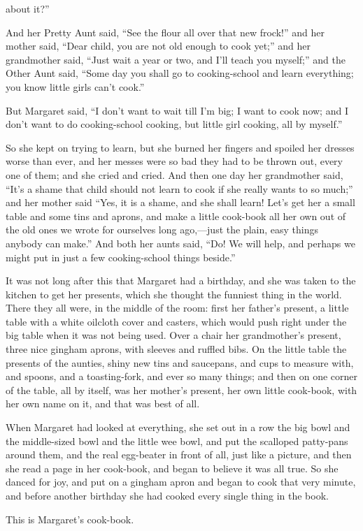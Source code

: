 \documentclass[11pt]{book}
\newcommand{\indpar}{\par\noindent\hspace*{\parindent}}
\begin{document}
about it?''
\indpar
  And her Pretty Aunt said, ``See the flour all over that new frock!''
and her mother said, ``Dear child, you are not old enough to cook yet;''
and her grandmother said, ``Just wait a year or two, and I'll teach you
myself;'' and the Other Aunt said, ``Some day you shall go to
cooking-school and learn everything; you know little girls can't cook.''
\indpar
  But Margaret said, ``I don't want to wait till I'm big; I want to
cook now; and I don't want to do cooking-school cooking, but little girl
cooking, all by myself.''
\indpar
  So she kept on trying to learn, $\!$but she burned her fingers and
spoiled her dresses worse than ever, and her messes were so bad they had
to be thrown out, every one of them; and she cried and cried.  And then
one day her grandmother said, ``It's a shame that child should not learn
to cook if she really wants to so much;'' and her mother said ``Yes, it is
a shame, and she shall learn!  Let's get her a small table and some tins
and aprons, and make a little cook-book all her own out of the old ones
we wrote for ourselves long ago,---just the plain, easy things anybody
can make.'' And both her aunts said, ``Do! We will help, and perhaps we
might put in just a few cooking-school things beside.''
\indpar
  It was not long after this that Margaret had a birthday, and she was
taken to the kitchen to get her presents, which she thought the funniest
thing in the world.  There they all were, in the middle of the room:
first her father's present, a little table with a white oilcloth cover
and casters, which would push right under the big table when it was not
being used.  Over a chair her grandmother's present, three nice gingham
aprons, with sleeves and ruffled bibs.  On the little table the presents
of the aunties, shiny new tins and saucepans, and cups to measure with,
and spoons, and a toasting-fork, and ever so many things; and then on
one corner of the table, all by itself, was her mother's present, her
own little cook-book, with her own name on it, and that was best of all.
\indpar
  When Margaret had looked at everything, she set out in a row the big
bowl and the middle-sized bowl and the little wee bowl, and put the
scalloped patty-pans around them, and the real egg-beater in front of
all, just like a picture, and then she read a page in her cook-book, and
began to believe it was all true.  So she danced for joy, and put on a
gingham apron and began to cook that very minute, and before another
birthday she had cooked every single thing in the book.
\indpar
  This is Margaret's cook-book.
\newpage
\thispagestyle{empty}
\end{document}
